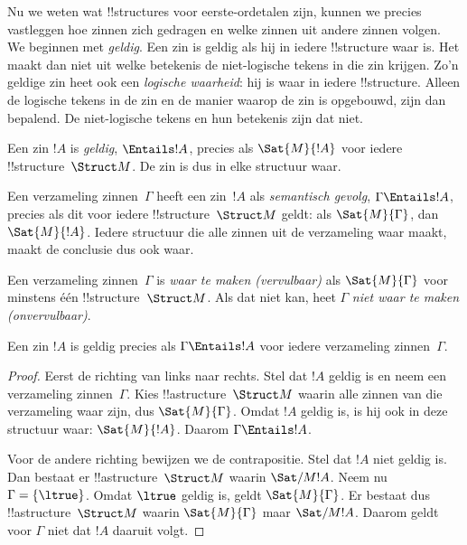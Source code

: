 \documentclass[../../../include/open-logic-section]{subfiles}
\begin{document}

\begin{explain}
Nu we weten wat !!{structure}s voor eerste-ordetalen zijn, kunnen we
precies vastleggen hoe zinnen zich gedragen en welke zinnen uit andere
zinnen volgen. We beginnen met \emph{geldig}. Een zin is geldig als
hij in iedere !!{structure} waar is. Het maakt dan niet uit welke
betekenis de niet-logische tekens in die zin krijgen. Zo'n geldige zin
heet ook een \emph{logische waarheid}: hij is waar in iedere
!!{structure}. Alleen de logische tekens in de zin en de manier waarop
de zin is opgebouwd, zijn dan bepalend. De niet-logische tekens en hun
betekenis zijn dat niet.
\end{explain}

\begin{defn}
Een zin $!A$ is \emph{geldig}, $\Entails !A$, precies als
$\Sat{M}{!A}$ voor iedere !!{structure}~$\Struct M$. De zin is dus in
elke structuur waar.
\end{defn}

\begin{defn}
Een verzameling zinnen~$\Gamma$ heeft een zin~$!A$ als
\emph{semantisch gevolg}, $\Gamma \Entails !A$, precies als dit voor
iedere !!{structure}~$\Struct M$ geldt: als $\Sat{M}{\Gamma}$, dan
$\Sat{M}{!A}$. Iedere structuur die alle zinnen uit de verzameling
waar maakt, maakt de conclusie dus ook waar.
\end{defn}


\begin{defn}
Een verzameling zinnen~$\Gamma$ is \emph{waar te maken
(vervulbaar)} als $\Sat{M}{\Gamma}$ voor minstens één
!!{structure}~$\Struct M$. Als dat niet kan, heet $\Gamma$
\emph{niet waar te maken (onvervulbaar)}.
\end{defn}

\begin{prop}
Een zin $!A$ is geldig precies als $\Gamma \Entails !A$ voor iedere
verzameling zinnen~$\Gamma$.
\end{prop}

\begin{proof}
Eerst de richting van links naar rechts. Stel dat $!A$ geldig is en
neem een verzameling zinnen~$\Gamma$. Kies !!a{structure}~$\Struct M$
waarin alle zinnen van die verzameling waar zijn, dus
$\Sat{M}{\Gamma}$. Omdat $!A$ geldig is, is hij ook in deze structuur
waar: $\Sat{M}{!A}$. Daarom $\Gamma \Entails !A$.

Voor de andere richting bewijzen we de contrapositie. Stel dat $!A$
niet geldig is. Dan bestaat er !!a{structure}~$\Struct M$ waarin
$\Sat/{M}{!A}$. Neem nu $\Gamma = \{ \ltrue \}$. Omdat $\ltrue$
geldig is, geldt $\Sat{M}{\Gamma}$. Er bestaat dus
!!a{structure}~$\Struct M$ waarin $\Sat{M}{\Gamma}$ maar
$\Sat/{M}{!A}$. Daarom geldt voor $\Gamma$ niet dat $!A$ daaruit
volgt.
\end{proof}
\end{document}
